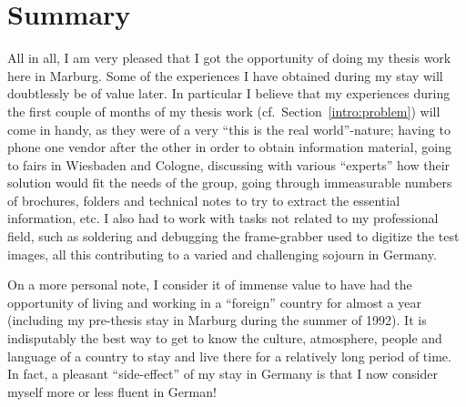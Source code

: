 
\section{Summary}
\label{concl:summary}

All in all, I am very pleased that I got the opportunity of doing my
thesis work here in Marburg.  Some of the experiences I have obtained
during my stay will doubtlessly be of value later.  In particular I
believe that my experiences during the first couple of months of my
thesis work (cf.\ Section~\ref{intro:problem}) will come in handy, as
they were of a very ``this is the real world''-nature; having to phone
one vendor after the other in order to obtain information material,
going to fairs in Wiesbaden and Cologne, discussing with various
``experts'' how their solution would fit the needs of the group, going
through immeasurable numbers of brochures, folders and technical notes
to try to extract the essential information, etc.  I also had to work
with tasks not related to my professional field, such as soldering and
debugging the frame-grabber used to digitize the test images, all this
contributing to a varied and challenging sojourn in Germany.

On a more personal note, I consider it of immense value to have had
the opportunity of living and working in a ``foreign'' country for
almost a year (including my pre-thesis stay in Marburg during the
summer of 1992).  It is indisputably the best way to get to know the
culture, atmosphere, people and language of a country to stay and live
there for a relatively long period of time.  In fact, a pleasant
``side-effect'' of my stay in Germany is that I now consider myself
more or less fluent in German!
